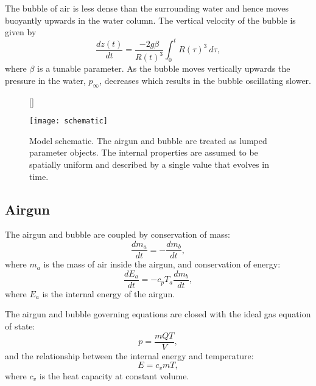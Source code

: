\documentclass[10pt]{article}
\begin{document}
The bubble of air is less dense than the surrounding water and hence moves buoyantly upwards in the water column. The vertical velocity of the bubble is given by \cite{Herring1941, Taylor1942, Langhammer1996}
\begin{equation}
\frac{dz(t)}{dt} = \frac{-2 g \beta}{R(t)^3} \int_0^t R(\tau)^3~d\tau,
\label{eq:depth}
\end{equation}
where $\beta$ is a tunable parameter. As the bubble moves vertically upwards the pressure in the water, $p_\infty$, decreases which results in the bubble oscillating slower.

\begin{figure}[t!]
\centering
{}[\FBwidth]
{\caption{Model schematic. The airgun and bubble are treated as lumped parameter objects. The internal properties are assumed to be spatially uniform and described by a single value that evolves in time. }
\label{fig:schematic}}
{\texttt{[image: schematic]}}
\end{figure}

\subsection{Airgun}
The airgun and bubble are coupled by conservation of mass:
\begin{equation}
\frac{dm_a}{dt} = -\frac{dm_b}{dt},
\end{equation}
where $m_a$ is the mass of air inside the airgun, and conservation of energy:
\begin{equation}
\frac{dE_a}{dt} = -c_p T_a \frac{dm_b}{dt},
\end{equation}
where $E_a$ is the internal energy of the airgun. 

The airgun and bubble governing equations are closed with the ideal gas equation of state:
\begin{equation}
p = \frac{mQT}{V},
\label{eq:ideal gas law}
\end{equation}
and the relationship between the internal energy and temperature:
\begin{equation}
E = c_v m T,
\end{equation}
where $c_v$ is the heat capacity at constant volume. 
\end{document}
